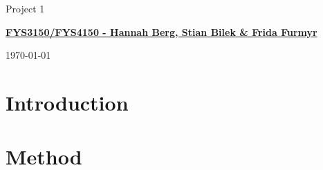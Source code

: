 \documentclass[%
oneside,                 %
final,                   %
10pt]{article}
\begin{document}

\newcommand{\exercisesection}[1]{\subsection*{#1}}






\thispagestyle{empty}

\begin{center}
{\LARGE\bf
\begin{spacing}{1.25}
Project 1
\end{spacing}
}
\end{center}


\begin{center}
{\bf \href{{https://github.com/stiandb/compfys}}{FYS3150/FYS4150 - Hannah Berg, Stian Bilek \& Frida Furmyr}}
\end{center}

    

\begin{center}
\today
\end{center}

\vspace{1cm}
\begin{abstract}
    
\end{abstract}

\newpage

\section{Introduction}

\newpage

\section{Method}
\end{document}
